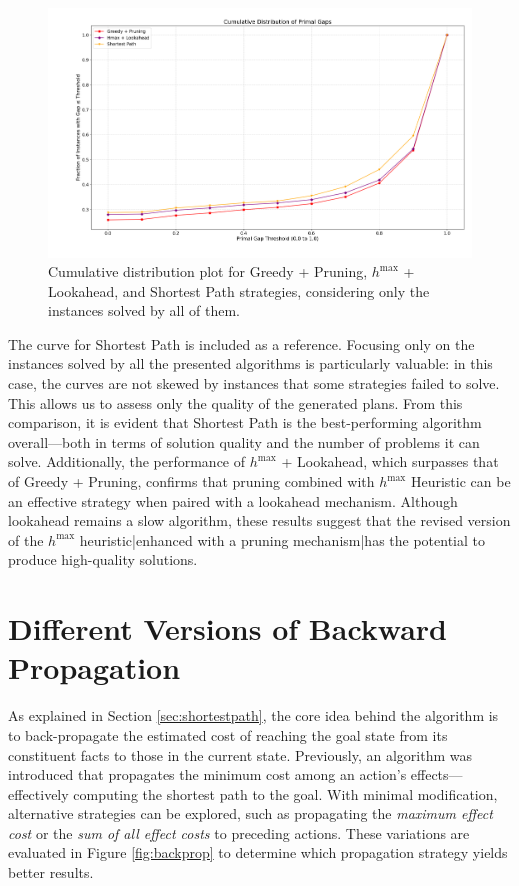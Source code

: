 \begin{figure}[ht]
	\centering
	\includegraphics[width=\textwidth]{images/algs234_solved_all.png}
	\caption{Cumulative distribution plot for Greedy + Pruning, $h^{\max}$ + Lookahead, and Shortest Path strategies,
		considering only the instances solved by all of them.}
	\label{fig:algs234_solved_all}
\end{figure}

The curve for Shortest Path is included as a reference. Focusing only on the instances solved by all the presented algorithms
is particularly valuable: in this case, the curves are not skewed by instances that some strategies failed to solve.
This allows us to assess only the quality of the generated plans. From this comparison, it is evident that Shortest Path
is the best-performing algorithm overall—both in terms of solution quality and the number of problems it can solve.
Additionally, the performance of $h^{\max}$ + Lookahead, which surpasses that of Greedy + Pruning, confirms that pruning combined
with $h^{\max}$ Heuristic can be an effective strategy when paired with a lookahead mechanism.
Although lookahead remains a slow algorithm, these results suggest that the revised version of the $h^{\max}$ heuristic|enhanced
with a pruning mechanism|has the potential to produce high-quality solutions.

\section{Different Versions of Backward Propagation}
As explained in Section \ref{sec:shortestpath}, the core idea behind the algorithm is to back-propagate the estimated cost
of reaching the goal state from its constituent facts to those in the current state. Previously, an algorithm was introduced
that propagates the minimum cost among an action's effects—effectively computing the shortest path to the goal.
With minimal modification, alternative strategies can be explored, such as propagating the \textit{maximum effect cost} or the
\textit{sum of all effect costs} to preceding actions. These variations are evaluated in Figure \ref{fig:backprop} to determine which
propagation strategy yields better results.

